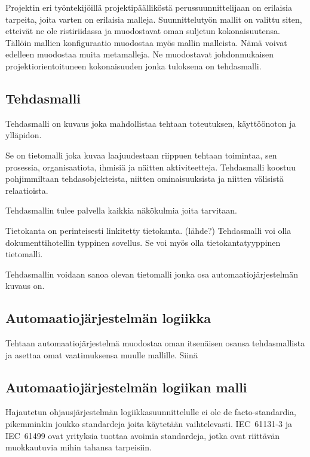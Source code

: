 \documentclass[finnish,12pt]{article}
\begin{document}
Projektin eri työntekijöillä projektipäälliköstä perussuunnittelijaan on erilaisia tarpeita, joita varten on erilaisia malleja. Suunnittelutyön mallit on valittu siten, etteivät ne ole ristiriidassa ja muodostavat oman suljetun kokonaisuutensa. Tällöin mallien konfiguraatio muodostaa myös mallin malleista. Nämä voivat edelleen muodostaa muita metamalleja. Ne muodostavat johdonmukaisen projektiorientoituneen kokonaisuuden jonka tuloksena on tehdasmalli.

		\subsection{Tehdasmalli}

Tehdasmalli on kuvaus joka mahdollistaa tehtaan toteutuksen, käyttöönoton ja ylläpidon.

Se on tietomalli joka kuvaa laajuudestaan riippuen tehtaan toimintaa, sen prosessia, organisaatiota, ihmisiä ja näitten aktiviteetteja. Tehdasmalli koostuu pohjimmiltaan tehdasobjekteista, niitten ominaisuuksista ja niitten välisistä relaatioista.

Tehdasmallin tulee palvella kaikkia näkökulmia joita tarvitaan.

Tietokanta on perinteisesti linkitetty tietokanta. (lähde?) Tehdasmalli voi olla dokumenttihotellin typpinen sovellus. Se voi myös olla tietokantatyyppinen tietomalli.

Tehdasmallin voidaan sanoa olevan tietomalli jonka osa automaatiojärjestelmän kuvaus on.

	\subsection{Automaatiojärjestelmän logiikka}

Tehtaan automaatiojärjestelmä muodostaa oman itsenäisen osansa tehdasmallista ja asettaa omat vaatimuksensa muulle mallille.
Siinä

		\subsection{Automaatiojärjestelmän logiikan malli}

Hajautetun ohjausjärjestelmän logiikkasuunnittelulle ei ole de facto-standardia, pikemminkin joukko standardeja joita käytetään vaihtelevasti.
IEC~61131-3 ja IEC~61499 ovat yrityksia tuottaa avoimia standardeja, jotka ovat riittävän muokkautuvia mihin tahansa tarpeisiin.
\end{document}
